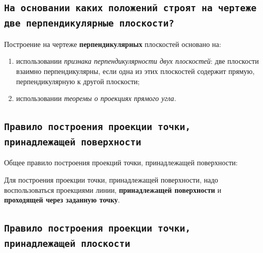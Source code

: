 
\newpage
\subsection{\texttt{На основании каких положений строят на чертеже две перпендикулярные плоскости?}}

\begin{myquote}
    
\end{myquote}

Построение на чертеже {\bf перпендикулярных} плоскостей основано на:
\begin{enumerate}
    \item использовании \textit {признака перпендикулярности двух плоскостей}: две плоскости взаимно перпендикулярны, если одна из этих плоскостей содержит прямую, перпендикулярную к другой плоскости;
    \item использовании \textit {теоремы о проекциях прямого угла}.
\end{enumerate}




\newpage
\subsection{\texttt{Правило построения проекции точки, принадлежащей поверхности}}

\begin{myquote}
\end{myquote}

Общее правило построения проекций точки, принадлежащей поверхности:

Для построения проекции точки, принадлежащей поверхности, надо воспользоваться проекциями линии, {\bf принадлежащей поверхности} и {\bf проходящей через заданную точку}. 


\newpage
\subsection{\texttt{Правило построения проекции точки, принадлежащей плоскости}}

\begin{myquote}
    
\end{myquote}

